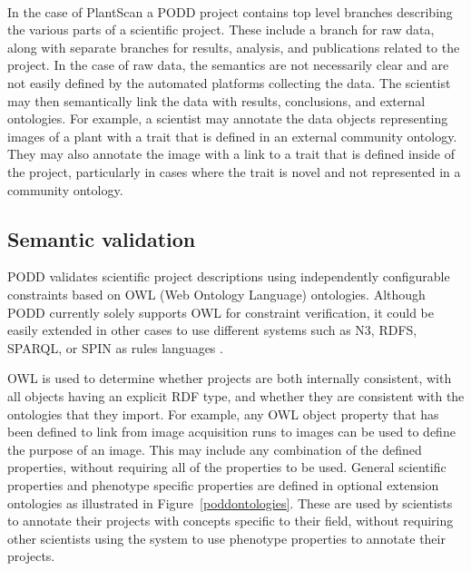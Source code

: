\documentclass{llncs}
\begin{document}
In the case of PlantScan\textsuperscript{\texttrademark} a PODD project contains top level branches describing the 
various parts of a scientific project. These include a branch for raw data, along with separate
branches for results, analysis, and publications related to the project. In the
case of raw data, the semantics are not necessarily clear and are not easily defined by the
automated platforms collecting the data. 
The scientist may then semantically link the data with results, conclusions, and external ontologies.
For example, a scientist may annotate the data objects representing images of a plant with a trait 
that is defined in an external community ontology. They may also annotate the image with a link 
to a trait that is defined inside of the project, particularly in cases where the trait is novel 
and not represented in a community ontology.

\subsection{Semantic validation}
PODD validates scientific project descriptions using independently configurable constraints based on OWL
(Web Ontology Language) ontologies. Although PODD currently solely supports OWL for 
constraint verification, it could be easily extended in other cases to use different
systems such as N3, RDFS, SPARQL, or SPIN as rules languages \cite{Fuerber2010}. 


OWL is used to determine whether projects are both internally consistent, with
all objects having an explicit RDF type, and whether they are consistent with
the ontologies that they import. 
For example, any OWL object
property that has been defined to link from image acquisition runs to images can
be used to define the purpose of an image. This may include any combination of
the defined properties, without requiring all of the properties to be used.
General scientific properties and phenotype specific properties are defined
in optional extension ontologies as illustrated in Figure~\ref{poddontologies}.
These are used by scientists to annotate their projects with concepts specific 
to their field, without requiring other scientists using the system to use phenotype 
properties to annotate their projects.
\end{document}
